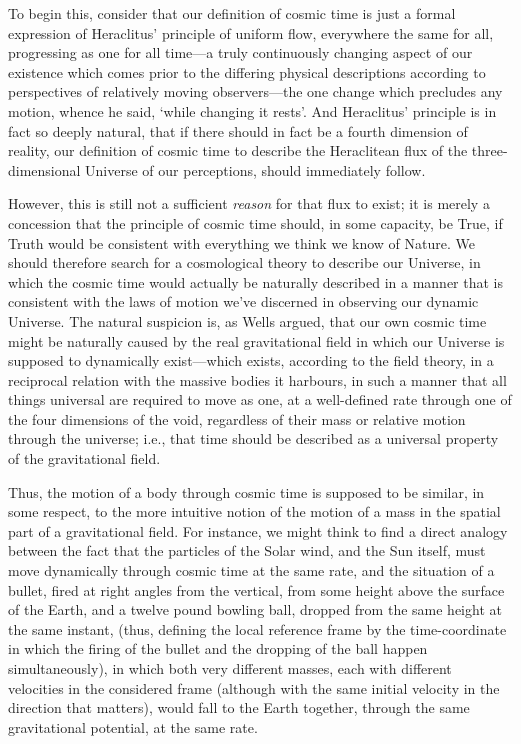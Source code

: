 To begin this, consider that our definition of cosmic time is just a formal expression of Heraclitus' principle of uniform flow, everywhere the same for all, progressing as one for all time---a truly continuously changing aspect of our existence which comes prior to the differing physical descriptions according to perspectives of relatively moving observers---the one change which precludes any motion, whence he said, `while changing it rests'. And Heraclitus' principle is in fact so deeply natural, that if there should in fact be a fourth dimension of reality, our definition of cosmic time to describe the Heraclitean flux of the three-dimensional Universe of our perceptions, should immediately follow.

However, this is still not a sufficient \textit{reason} for that flux to exist; it is merely a concession that the principle of cosmic time should, in some capacity, be True, if Truth would be consistent with everything we think we know of Nature. We should therefore search for a cosmological theory to describe our Universe, in which the cosmic time would actually be naturally described in a manner that is consistent with the laws of motion we've discerned in observing our dynamic Universe. The natural suspicion is, as Wells argued, that our own cosmic time might be naturally caused by the real gravitational field in which our Universe is supposed to dynamically exist---which exists, according to the field theory, in a reciprocal relation with the massive bodies it harbours, in such a manner that all things universal are required to move as one, at a well-defined rate through one of the four dimensions of the void, regardless of their mass or relative motion through the universe; i.e., that time should be described as a universal property of the gravitational field.

Thus, the motion of a body through cosmic time is supposed to be similar, in some respect, to the more intuitive notion of the motion of a mass in the spatial part of a gravitational field. For instance, we might think to find a direct analogy between the fact that the particles of the Solar wind, and the Sun itself, must move dynamically through cosmic time at the same rate, and the situation of a bullet, fired at right angles from the vertical, from some height above the surface of the Earth, and a twelve pound bowling ball, dropped from the same height at the same instant, (thus, defining the local reference frame by the time-coordinate in which the firing of the bullet and the dropping of the ball happen simultaneously), in which both very different masses, each with different velocities in the considered frame (although with the same initial velocity in the direction that matters), would fall to the Earth together, through the same gravitational potential, at the same rate. 

